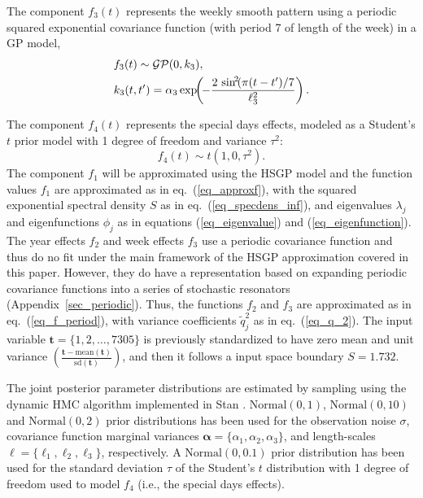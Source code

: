 The component $f_3(t)$ represents the weekly smooth pattern using a periodic squared exponential covariance function (with period 7 of length of the week) in a GP model,
%
\begin{align*}
&f_3(t) \sim \operatorname{\mathcal{GP}}(0,k_3), \\
&k_3(t,t') = \alpha_3 \exp\!\!\left(\!-\frac{2\,\sin^{\!2}\!(\pi(t-t')/7}{\ell_3^2}\right). 
\end{align*}

The component $f_4(t)$ represents the special days effects, modeled as a Student's $t$ prior model with 1 degree of freedom and variance $\tau^2$:
%
\begin{equation*}
f_4(t) \sim t(1,0,\tau^2).
\end{equation*}
%
The component $f_1$ will be approximated using the HSGP model and the function values $f_1$ are approximated as in eq.~(\ref{eq_approxf}), with the squared exponential spectral density $S$ as in eq.~(\ref{eq_specdens_inf}), and eigenvalues $\lambda_j$ and eigenfunctions $\phi_j$ as in equations (\ref{eq_eigenvalue}) and (\ref{eq_eigenfunction}). The year effects $f_2$ and week effects $f_3$ use a periodic covariance function  and thus do no fit under the main framework of the HSGP approximation covered in this paper. However, they do have a representation based on expanding periodic covariance functions into a series of stochastic resonators (Appendix~\ref{sec_periodic}). Thus, the functions $f_2$ and $f_3$ are approximated as in eq.~(\ref{eq_f_period}), with variance coefficients $\tilde{q}_j^2$ as in eq.~(\ref{eq_q_2}). {\color{blue}The input variable $\bm{t}=\{1,2,\dots,7305\}$ is previously standardized to have zero mean and unit variance $\left(\frac{\bm{t}-\text{mean}(\bm{t})}{\text{sd}(\bm{t})}\right)$, and then it follows a input space boundary $S=1.732$}.

The joint posterior parameter distributions are estimated by sampling using the dynamic HMC algorithm implemented in Stan \citep{StanTeam:2021}. $\mathrm{Normal}(0,1)$, \linebreak $\mathrm{Normal}(0,10)$ and $\mathrm{Normal}(0,2)$ prior distributions has been used for the observation noise $\sigma$, covariance function marginal variances $\bm{\alpha}=\{\alpha_1, \alpha_2, \alpha_3\}$, and length-scales $\bm{\ell}=\{\ell_1, \ell_2, \ell_3\}$, respectively. A $\mathrm{Normal}(0,0.1)$ prior distribution has been used for the standard deviation $\tau$ of the Student's $t$ distribution with 1 degree of freedom used to model $f_4$ (i.e., the special days effects).

